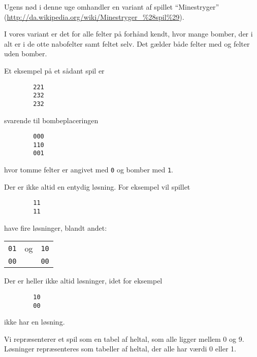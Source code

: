 \documentclass[a4paper]{article}
\begin{document}
Ugens nød i denne uge omhandler en variant af spillet "`Minestryger"'
(\url{http://da.wikipedia.org/wiki/Minestryger_%28spil%29}).

I vores variant er det for alle felter på forhånd kendt, hvor mange
bomber, der i alt er i de otte nabofelter samt feltet selv.  Det
gælder både felter med og felter uden bomber.

Et eksempel på et sådant spil er

\begin{verbatim}
        221
        232
        232
\end{verbatim}
  
svarende til bombeplaceringen

\begin{verbatim}
        000
        110
        001
\end{verbatim}

\noindent
hvor tomme felter er angivet med \texttt{0} og bomber med \texttt{1}.

Der er ikke altid en entydig løsning.  For eksempel vil spillet

\begin{verbatim}
        11
        11
\end{verbatim}
 
have fire løsninger, blandt andet:

\vspace{1ex}

\noindent
\begin{tabular}{@{\texttt{~~~~~~~~}}lcl}
\texttt{01} & og & \texttt{10} \\
\texttt{00} &  & \texttt{00}
\end{tabular}
\vspace{1ex}

Der er heller ikke altid løsninger, idet for eksempel

\begin{verbatim}
        10
        00
\end{verbatim}
 
ikke har en løsning.

Vi repræsenterer et spil som en tabel af heltal, som alle ligger
mellem 0 og 9.  Løsninger repræsenteres som tabeller af heltal, der
alle har værdi 0 eller 1.
\end{document}
